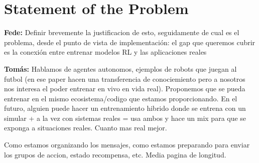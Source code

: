 \documentclass[preprint,3p]{elsarticle}
\newcommand{\fcom}[1]{{ \color{orange}\textbf{Fede:} #1}}
\newcommand{\tcom}[1]{{ \color{blue}\textbf{Tomás:} #1}}
\newcommand{\checked}{$\text{\rlap{$\checkmark$}}\square$}
\newcommand{\unchecked}{$\square$}
\begin{document}


\section{Statement of the Problem}
\label{statement}

\fcom{Definir brevemente la justificacion de esto, seguidamente de cual es el problema, desde el punto de vista de implementación: el gap que queremos cubrir es la conexión entre entrenar modelos RL y las aplicaciones reales}

\tcom{Hablamos de agentes autonomos, ejemplos de robots que juegan al futbol (en ese paper hacen una transferencia de conociemiento pero a nosotros nos interesa el poder entrenar en vivo en vida real). Proponemos que se pueda entrenar en el mismo ecosistema/codigo que estamos proporcionando. En el futuro, alguien puede hacer un entrenamiento hibrido donde se entrena con un simular + a la vez con sistemas reales = usa ambos y hace un mix para que se exponga a situaciones reales. Cuanto mas real mejor.

Como estamos organizando los mensajes, como estamos preparando para enviar los grupos de accion, estado recompensa, etc.
Media pagina de longitud.}
\end{document}
